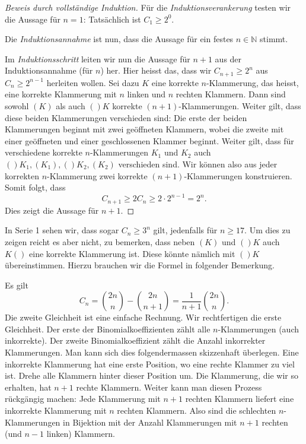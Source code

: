 \documentclass[../main.tex]{subfiles}
\begin{document}
\begin{proof}[Beweis durch vollständige Induktion]
  Für die \emph{Induktionsverankerung} testen wir die Aussage für $n = 1$:
  Tatsächlich
  ist $C_{1} \geq 2^{0}$.

  Die \emph{Induktionsannahme} ist nun,
  dass die Aussage für ein festes $n \in \mathbb N$ stimmt.

  Im \emph{Induktionsschritt} leiten wir nun die Aussage für $n + 1$
  aus der Induktionsannahme (für $n$) her.
  Hier heisst das, dass wir $C_{n+1} \geq 2^{n}$ aus $C_{n} \geq 2^{n-1}$
  herleiten wollen. Sei dazu $K$ eine korrekte $n$-Klammerung,
  das heisst, eine korrekte
  Klammerung mit $n$ linken und $n$ rechten Klammern.
  Dann sind sowohl $(K)$ als auch $()K$ korrekte $(n+1)$-Klammerungen.
  Weiter gilt, dass diese beiden Klammerungen verschieden sind:
  Die erste der beiden Klammerungen beginnt mit zwei geöffneten Klammern,
  wobei die zweite mit einer geöffneten und einer geschlossenen
  Klammer beginnt.
  Weiter gilt, dass für verschiedene
  korrekte $n$-Klammerungen $K_{1}$ und $K_{2}$
  auch $()K_{1}, (K_{1}), ()K_{2}, (K_{2})$ verschieden sind.
  Wir können also aus jeder korrekten $n$-Klammerung zwei korrekte
  $(n+1)$-Klammerungen konstruieren. Somit folgt, dass
  \[C_{n+1} \geq 2 C_{n} \geq 2 \cdot 2^{n-1} = 2^{n}.\]
  Dies zeigt die Aussage für $n+ 1$.
\end{proof}

In Serie 1 sehen wir, dass sogar $C_{n} \geq 3^{n}$ gilt,
jedenfalls für $n \geq 17$.
Um dies zu zeigen reicht es aber nicht, zu bemerken,
dass neben $(K)$ und $()K$ auch $K()$ eine korrekte
Klammerung ist. Diese könnte nämlich mit $()K$
übereinstimmen.
Hierzu brauchen wir die Formel in folgender Bemerkung.

\begin{remark}
  Es gilt
  \[
    C_{n} = \binom{2n}{n} - \binom{2n}{n+1} = \frac{1}{n+1}\binom{2n}{n}.
  \]
  Die zweite Gleichheit ist eine einfache Rechnung.
  Wir rechtfertigen die erste Gleichheit.
  Der erste der Binomialkoeffizienten zählt alle $n$-Klammerungen (auch inkorrekte).
  Der zweite Binomialkoeffizient zählt die Anzahl inkorrekter Klammerungen.
  Man kann sich dies folgendermassen skizzenhaft überlegen.
  Eine inkorrekte Klammerung hat eine erste Position,
  wo eine rechte Klammer zu viel ist.
  Drehe alle Klammern hinter dieser Position um.
  Die Klammerung, die wir so erhalten, hat $n+1$ rechte Klammern.
  Weiter kann man diesen Prozess rückgängig machen:
  Jede Klammerung mit $n+1$ rechten Klammern
  liefert eine inkorrekte Klammerung mit $n$ rechten Klammern.
  Also sind die schlechten $n$-Klammerungen in Bijektion
  mit der Anzahl Klammerungen mit $n+1$ rechten
  (und $n-1$ linken) Klammern.
\end{remark}
\end{document}
